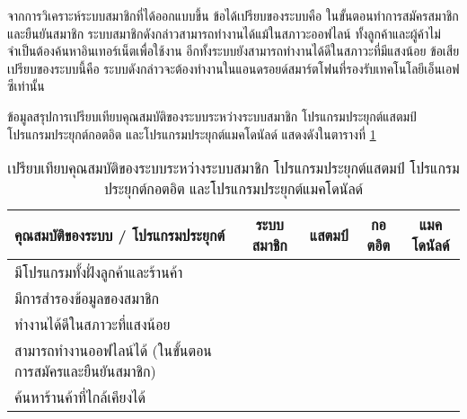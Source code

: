 \documentclass[12pt,a4paper]{article}
\newcommand{\cmark}{\ding{51}}
\newcommand{\xmark}{\ding{55}}
\begin{document}

จากการวิเคราะห์ระบบสมาชิกที่ได้ออกแบบขึ้น ข้อได้เปรียบของระบบคือ ในขั้นตอนทำการสมัครสมาชิก และยืนยันสมาชิก ระบบสมาชิกดังกล่าวสามารถทำงานได้แม้ในสภาวะออฟไลน์ ทั้งลูกค้าและผู้ค้าไม่จำเป็นต้องค้นหาอินเทอร์เน็ตเพื่อใช้งาน อีกทั้งระบบยังสามารถทำงานได้ดีในสภาวะที่มีแสงน้อย ข้อเสียเปรียบของระบบนี้คือ ระบบดังกล่าวจะต้องทำงานในแอนดรอยด์สมาร์ตโฟนที่รองรับเทคโนโลยีเอ็นเอฟซีเท่านั้น


ข้อมูลสรุปการเปรียบเทียบคุณสมบัติของระบบระหว่างระบบสมาชิก โปรแกรมประยุกต์แสตมป์ โปรแกรมประยุกต์กอตอิต และโปรแกรมประยุกต์แมคโดนัลด์ แสดงดังในตารางที่ \ref{tab:compare_feature}

\begin{table}[ht!]
\centering
\resizebox{140mm}{!} {
\begin{tabular}{ | l | c | c | c | c |}
	\hline                        
	\bfseries{คุณสมบัติของระบบ / โปรแกรมประยุกต์} & \bfseries{ระบบสมาชิก} & \bfseries{แสตมป์} & \bfseries{กอตอิต} & \bfseries{แมคโดนัลด}์ \\
  	\hline 
  	มีโปรแกรมทั้งฝั่งลูกค้าและร้านค้า		& \cmark & \xmark & \xmark & \xmark \\
  	\hline
  	มีการสำรองข้อมูลของสมาชิก			& \cmark & \cmark & \cmark & \xmark \\
  	\hline
  	ทำงานได้ดีในสภาวะที่แสงน้อย 			& \cmark & \cmark & \xmark & \xmark \\
  	\hline
  	สามารถทำงานออฟไลน์ได้	 (ในขั้นตอนการสมัครและยืนยันสมาชิก) 	& \cmark & \cmark & \cmark & \xmark \\
  	\hline
  	ค้นหาร้านค้าที่ไกล้เคียงได้				& \xmark & \xmark & \cmark & \cmark \\
  	\hline
\end{tabular}
}
\caption{เปรียบเทียบคุณสมบัติของระบบระหว่างระบบสมาชิก โปรแกรมประยุกต์แสตมป์ โปรแกรมประยุกต์กอตอิต และโปรแกรมประยุกต์แมคโดนัลด์}
\label{tab:compare_feature}
\end{table}
\end{document}
